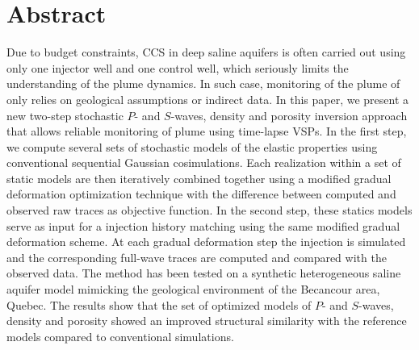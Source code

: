 \section{Abstract}
Due to budget constraints, CCS in deep saline aquifers is often carried out
using only one injector well and one control well, which seriously limits
the understanding of the  plume dynamics. In such case, monitoring of the
plume of  only relies on geological assumptions or indirect data. In this
paper, we present a new two-step stochastic $P$- and $S$-waves, density and
porosity inversion approach that allows reliable monitoring of  plume
using time-lapse VSPs. In the first step, we compute several sets of stochastic
models of the elastic properties using conventional sequential Gaussian
cosimulations. Each realization within a set of static models are then
iteratively combined together using a modified gradual deformation optimization
technique with the difference between computed and observed raw traces as
objective function. In the second step, these statics models serve as input for
a  injection history matching using the same modified gradual
deformation scheme. At each gradual deformation step the  injection is
simulated and the corresponding full-wave traces are computed and compared with
the observed data. The method has been tested on a synthetic heterogeneous
saline aquifer model mimicking the geological environment of the
Becancour area, Quebec. The results show that the set of optimized models of
$P$- and $S$-waves, density and porosity showed an improved structural similarity
with the reference models compared to conventional simulations.
